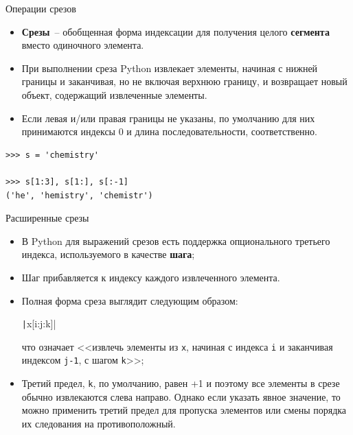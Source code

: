 \documentclass[aspectratio=169, mathserif]{beamer}%
\begin{document}
\begin{frame}[fragile]{Операции срезов}

\scriptsize
\begin{itemize}
\item \textcolor{extraorange}{\textbf{Срезы}}~-- обобщенная форма индексации для получения целого \textcolor{extraorange}{\textbf{сегмента}} вместо одиночного элемента.

\item При выполнении среза Python извлекает элементы, начиная с нижней границы и заканчивая, но не включая верхнюю границу, и возвращает новый объект, содержащий извлеченные элементы.
\item Если левая и/или правая границы не указаны, по умолчанию для них принимаются индексы 0 и длина последовательности, соответственно.
\end{itemize}

\begin{verbatim}
>>> s = 'chemistry'

>>> s[1:3], s[1:], s[:-1]
('he', 'hemistry', 'chemistr')
\end{verbatim}

\vfill
\end{frame}


\begin{frame}[fragile]{Расширенные срезы}
\scriptsize
\begin{itemize}
\item В Python для выражений срезов есть поддержка опционального третьего индекса, используемого в качестве \textcolor{extraorange}{\textbf{шага}};

\item  Шаг прибавляется к индексу каждого извлеченного элемента.

\item Полная форма среза выглядит следующим образом:
\begin{center}
\texttt|x[i:j:k]|
\end{center}

\noindent что означает <<извлечь элементы из \texttt{x}, начиная с индекса \texttt{i} и заканчивая индексом \texttt{j-1}, с шагом \texttt{k}>>;

\item Третий предел, \texttt{k}, по умолчанию, равен +1 и поэтому все элементы в срезе обычно извлекаются слева направо. Однако если указать явное значение, то можно применить третий предел для пропуска элементов или смены порядка их следования на противоположный.
\end{itemize}
\vfill
\end{frame}
\end{document}
